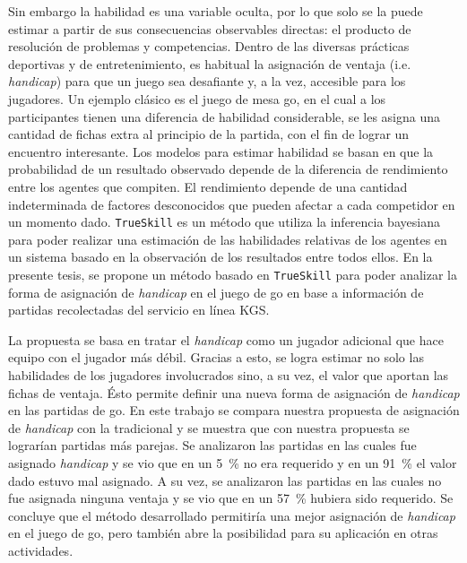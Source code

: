\documentclass[11pt,twoside,spanish]{report} %
\begin{document}
Sin embargo la habilidad es una variable oculta, por lo que solo se la puede estimar a partir de sus consecuencias observables directas: el producto de resoluci\'on de problemas y competencias.
Dentro de las diversas pr\'acticas deportivas y de entretenimiento, es habitual la asignaci\'on de ventaja (i.e. \emph{handicap}) para que un juego sea desafiante y, a la vez, accesible para los jugadores.
Un ejemplo cl\'asico es el juego de mesa go, en el cual a los participantes tienen una diferencia de habilidad considerable, se les asigna una cantidad de fichas extra al principio de la partida, con el fin de lograr un encuentro interesante.
%
Los modelos para estimar habilidad se basan en que la probabilidad de un resultado observado depende de la diferencia de rendimiento entre los agentes que compiten.
El rendimiento depende de una cantidad indeterminada de factores desconocidos que pueden afectar a cada competidor en un momento dado.
\texttt{TrueSkill} es un m\'etodo que utiliza la inferencia bayesiana para poder realizar una estimaci\'on de las habilidades relativas de los agentes en un sistema basado en la observaci\'on de los resultados entre todos ellos.
En la presente tesis, se propone un m\'etodo basado en \texttt{TrueSkill} para poder analizar la forma de asignaci\'on de \emph{handicap} en el juego de go en base a informaci\'on de partidas recolectadas del servicio en l\'inea KGS.

% 
% 
La propuesta se basa en tratar el \emph{handicap} como un jugador adicional que hace equipo con el jugador m\'as d\'ebil. 
Gracias a esto, se logra estimar no solo las habilidades de los jugadores involucrados sino, a su vez, el valor que aportan las fichas de ventaja.
\'Esto permite definir una nueva forma de asignaci\'on de \emph{handicap} en las partidas de go.
En este trabajo se compara nuestra propuesta de asignaci\'on de \emph{handicap} con la tradicional y se muestra que con nuestra propuesta se lograr\'ian partidas m\'as parejas.
Se analizaron las partidas en las cuales fue asignado \emph{handicap} y se vio que en un \SI{5}{\percent} no era requerido y en un \SI{91}{\percent} el valor dado estuvo mal asignado.
A su vez, se analizaron las partidas en las cuales no fue asignada ninguna ventaja y se vio que en un \SI{57}{\percent} hubiera sido requerido. 
Se concluye que el m\'etodo desarrollado permitir\'ia una mejor asignaci\'on de \emph{handicap} en el juego de go, pero tambi\'en abre la posibilidad para su aplicaci\'on en otras actividades.
\end{document}
